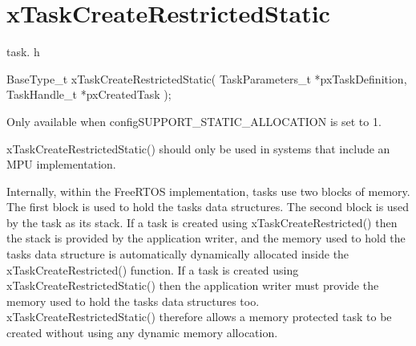 \hypertarget{group__x_task_create_restricted_static}{}\section{x\+Task\+Create\+Restricted\+Static}
\label{group__x_task_create_restricted_static}
task. h 
\begin{DoxyPre}
 BaseType\_t xTaskCreateRestrictedStatic( TaskParameters\_t *pxTaskDefinition, TaskHandle\_t *pxCreatedTask );\end{DoxyPre}


Only available when config\+S\+U\+P\+P\+O\+R\+T\+\_\+\+S\+T\+A\+T\+I\+C\+\_\+\+A\+L\+L\+O\+C\+A\+T\+I\+ON is set to 1.

x\+Task\+Create\+Restricted\+Static() should only be used in systems that include an M\+PU implementation.

Internally, within the Free\+R\+T\+OS implementation, tasks use two blocks of memory. The first block is used to hold the task\textquotesingle{}s data structures. The second block is used by the task as its stack. If a task is created using x\+Task\+Create\+Restricted() then the stack is provided by the application writer, and the memory used to hold the task\textquotesingle{}s data structure is automatically dynamically allocated inside the x\+Task\+Create\+Restricted() function. If a task is created using x\+Task\+Create\+Restricted\+Static() then the application writer must provide the memory used to hold the task\textquotesingle{}s data structures too. x\+Task\+Create\+Restricted\+Static() therefore allows a memory protected task to be created without using any dynamic memory allocation.


